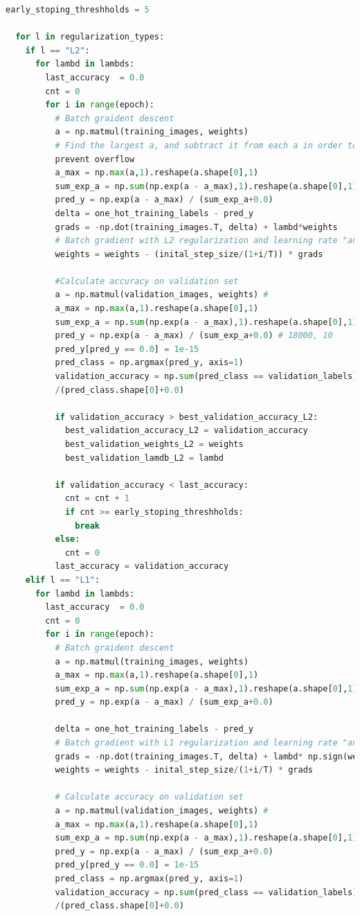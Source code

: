 \documentclass{article} %
\begin{document}
{\begin{lstlisting}[language=Python]
  early_stoping_threshholds = 5

  for l in regularization_types:
	if l == "L2":
	  for lambd in lambds:
	    last_accuracy  = 0.0
	    cnt = 0
	    for i in range(epoch):
		  # Batch graident descent
		  a = np.matmul(training_images, weights) 
		  # Find the largest a, and subtract it from each a in order to \
		  prevent overflow
		  a_max = np.max(a,1).reshape(a.shape[0],1)
		  sum_exp_a = np.sum(np.exp(a - a_max),1).reshape(a.shape[0],1) 
		  pred_y = np.exp(a - a_max) / (sum_exp_a+0.0) 
		  delta = one_hot_training_labels - pred_y 
		  grads = -np.dot(training_images.T, delta) + lambd*weights
		  # Batch gradient with L2 regularization and learning rate "annealing"
		  weights = weights - (inital_step_size/(1+i/T)) * grads

		  #Calculate accuracy on validation set
		  a = np.matmul(validation_images, weights) #
		  a_max = np.max(a,1).reshape(a.shape[0],1)
		  sum_exp_a = np.sum(np.exp(a - a_max),1).reshape(a.shape[0],1) # 18000, 1
		  pred_y = np.exp(a - a_max) / (sum_exp_a+0.0) # 18000, 10
		  pred_y[pred_y == 0.0] = 1e-15       
		  pred_class = np.argmax(pred_y, axis=1)
		  validation_accuracy = np.sum(pred_class == validation_labels) \
		  /(pred_class.shape[0]+0.0)
	
		  if validation_accuracy > best_validation_accuracy_L2:
			best_validation_accuracy_L2 = validation_accuracy
			best_validation_weights_L2 = weights
			best_validation_lamdb_L2 = lambd

		  if validation_accuracy < last_accuracy:
			cnt = cnt + 1
			if cnt >= early_stoping_threshholds:
			  break
		  else:
			cnt = 0
		  last_accuracy = validation_accuracy
	elif l == "L1":
	  for lambd in lambds:
	    last_accuracy  = 0.0
	    cnt = 0
	    for i in range(epoch):
		  # Batch graident descent
		  a = np.matmul(training_images, weights)
		  a_max = np.max(a,1).reshape(a.shape[0],1)
		  sum_exp_a = np.sum(np.exp(a - a_max),1).reshape(a.shape[0],1)  
		  pred_y = np.exp(a - a_max) / (sum_exp_a+0.0) 

		  delta = one_hot_training_labels - pred_y 
		  # Batch gradient with L1 regularization and learning rate "annealing"
		  grads = -np.dot(training_images.T, delta) + lambd* np.sign(weights)
		  weights = weights - inital_step_size/(1+i/T) * grads

		  # Calculate accuracy on validation set
		  a = np.matmul(validation_images, weights) #
		  a_max = np.max(a,1).reshape(a.shape[0],1)
		  sum_exp_a = np.sum(np.exp(a - a_max),1).reshape(a.shape[0],1)
		  pred_y = np.exp(a - a_max) / (sum_exp_a+0.0) 
		  pred_y[pred_y == 0.0] = 1e-15       
		  pred_class = np.argmax(pred_y, axis=1)
		  validation_accuracy = np.sum(pred_class == validation_labels)\
		  /(pred_class.shape[0]+0.0)


\end{lstlisting}}
\end{document}
